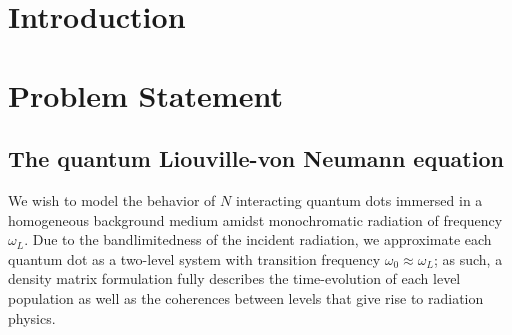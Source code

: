 \documentclass[conference]{IEEEtran}
\begin{document}
\IEEEpeerreviewmaketitle

\section{Introduction}


\section{Problem Statement}

\subsection{The quantum Liouville-von Neumann equation}
We wish to model the behavior of $N$ interacting quantum dots immersed in a homogeneous background medium amidst monochromatic radiation of frequency $\omega_L$.
Due to the bandlimitedness of the incident radiation, we approximate each quantum dot as a two-level system with transition frequency $\omega_0 \approx \omega_L$; as such, a density matrix formulation fully describes the time-evolution of each level population as well as the coherences between levels that give rise to radiation physics.
\end{document}
